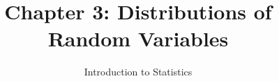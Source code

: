 \documentclass[slidestop,compress,mathserif]{beamer}
\title[Chp 3: Distributions of RVs]{Chapter 3: Distributions of Random Variables}
\author{Introduction to Statistics}
\date{}
\institute{}
\begin{document}


\begin{frame}[plain]

\titlepage

\end{frame}








\end{document}
